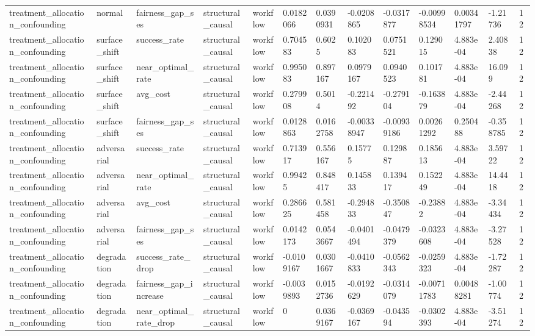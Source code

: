 \begin{tabular}{lllllllllllll}
treatment\_allocation\_confounding & normal & fairness\_gap\_ses & structural\_causal & workflow & 0.0182066 & 0.0390931 & -0.0208865 & -0.0317877 & -0.00998534 & 0.00341797 & -1.21736 & 12 \\
treatment\_allocation\_confounding & surface\_shift & success\_rate & structural\_causal & workflow & 0.704583 & 0.6025 & 0.102083 & 0.0751521 & 0.129015 & 4.883e-04 & 2.40838 & 12 \\
treatment\_allocation\_confounding & surface\_shift & near\_optimal\_rate & structural\_causal & workflow & 0.995083 & 0.897167 & 0.0979167 & 0.0940523 & 0.101781 & 4.883e-04 & 16.099 & 12 \\
treatment\_allocation\_confounding & surface\_shift & avg\_cost & structural\_causal & workflow & 0.279908 & 0.5014 & -0.221492 & -0.279104 & -0.163879 & 4.883e-04 & -2.44268 & 12 \\
treatment\_allocation\_confounding & surface\_shift & fairness\_gap\_ses & structural\_causal & workflow & 0.0128863 & 0.0162758 & -0.00338947 & -0.00939186 & 0.00261292 & 0.250488 & -0.358785 & 12 \\
treatment\_allocation\_confounding & adversarial & success\_rate & structural\_causal & workflow & 0.713917 & 0.556167 & 0.15775 & 0.129887 & 0.185613 & 4.883e-04 & 3.59722 & 12 \\
treatment\_allocation\_confounding & adversarial & near\_optimal\_rate & structural\_causal & workflow & 0.99425 & 0.848417 & 0.145833 & 0.139417 & 0.152249 & 4.883e-04 & 14.4418 & 12 \\
treatment\_allocation\_confounding & adversarial & avg\_cost & structural\_causal & workflow & 0.286625 & 0.581458 & -0.294833 & -0.350847 & -0.23882 & 4.883e-04 & -3.34434 & 12 \\
treatment\_allocation\_confounding & adversarial & fairness\_gap\_ses & structural\_causal & workflow & 0.0142173 & 0.0543667 & -0.0401494 & -0.0479379 & -0.0323608 & 4.883e-04 & -3.27528 & 12 \\
treatment\_allocation\_confounding & degradation & success\_rate\_drop & structural\_causal & workflow & -0.0109167 & 0.0301667 & -0.0410833 & -0.0562343 & -0.0259323 & 4.883e-04 & -1.72287 & 12 \\
treatment\_allocation\_confounding & degradation & fairness\_gap\_increase & structural\_causal & workflow & -0.0039893 & 0.0152736 & -0.0192629 & -0.0314079 & -0.00711783 & 0.00488281 & -1.00774 & 12 \\
treatment\_allocation\_confounding & degradation & near\_optimal\_rate\_drop & structural\_causal & workflow & 0 & 0.0369167 & -0.0369167 & -0.043594 & -0.0302393 & 4.883e-04 & -3.51274 & 12 \\

\end{tabular}
